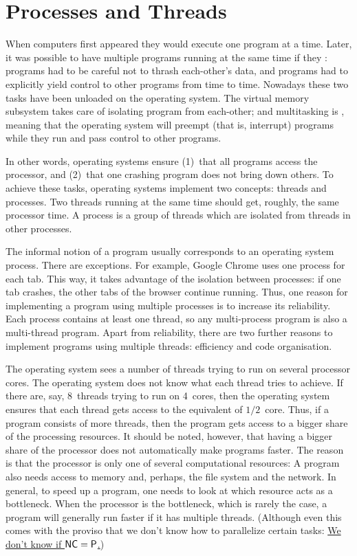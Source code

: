 \chapter{Processes and Threads}\label{ch:08-multiprocessing}

\noindent
When computers first appeared they would execute one program at a time.
Later,
  it was possible to have multiple programs running at the same time
  if they :
programs had to be careful not to thrash each-other's data,
and programs had to explicitly yield control to other programs from time to time.
Nowadays these two tasks have been unloaded on the operating system.
The virtual memory subsystem takes care of isolating program from each-other;
and multitasking is ,
  meaning that the operating system will preempt (that is, interrupt)
  programs while they run and pass control to other programs.

In other words, operating systems ensure
  (1)~that all programs access the processor, and
  (2)~that one crashing program does not bring down others.
To achieve these tasks, operating systems implement two concepts:
  threads and processes.
Two threads running at the same time should get, roughly, the same processor time.
A process is a group of threads which are isolated from threads in other processes.

The informal notion of a program usually corresponds to an operating system process.
There are exceptions.
For example, Google Chrome uses one process for each tab.
This way,
  it takes advantage of the isolation between processes:
  if one tab crashes, the other tabs of the browser continue running.
Thus, one reason for implementing a program using multiple processes
  is to increase its reliability.
Each process contains at least one thread,
  so any multi-process program is also a multi-thread program.
Apart from reliability, there are two further reasons to implement programs
  using multiple threads: efficiency and code organisation.

The operating system sees a number of threads trying to run on several processor cores.
The operating system does not know what each thread tries to achieve.
If there are, say, 8~threads trying to run on 4~cores,
  then the operating system ensures that each thread gets access
    to the equivalent of $1/2$~core.
Thus, if a program consists of more threads,
  then the program gets access to a bigger share of the processing resources.
It should be noted, however,
  that having a bigger share of the processor
    does not automatically make programs faster.
The reason is that the processor is only one of several computational resources:
A program also needs access to memory and, perhaps, the file system and the network.
In general, to speed up a program,
  one needs to look at which resource acts as a bottleneck.
When the processor is the bottleneck, which is rarely the case,
  a program will generally run faster if it has multiple threads.
(Although even this comes with the proviso that
  we don't know how to parallelize certain tasks:
\href{https://en.wikipedia.org/wiki/NC_(complexity)}%
  {We don't know if ${\sf NC}={\sf P}$.})


